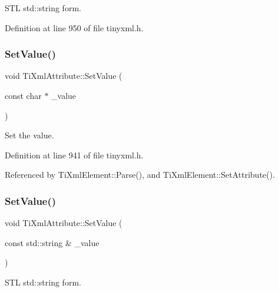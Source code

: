 S\+TL std\+::string form. 



Definition at line 950 of file tinyxml.\+h.

\hypertarget{class_ti_xml_attribute_a2dae44178f668b3cb48101be4f2236a0}{}\label{class_ti_xml_attribute_a2dae44178f668b3cb48101be4f2236a0} 
\subsubsection{\texorpdfstring{Set\+Value()}{SetValue()}\hspace{0.1cm}{\footnotesize\ttfamily [1/2]}}
{\footnotesize\ttfamily void Ti\+Xml\+Attribute\+::\+Set\+Value (\begin{DoxyParamCaption}\item[{const char $\ast$}]{\+\_\+value }\end{DoxyParamCaption})\hspace{0.3cm}{\ttfamily [inline]}}



Set the value. 



Definition at line 941 of file tinyxml.\+h.



Referenced by Ti\+Xml\+Element\+::\+Parse(), and Ti\+Xml\+Element\+::\+Set\+Attribute().

\hypertarget{class_ti_xml_attribute_ab43f67a0cc3ec1d80e62606500f0925f}{}\label{class_ti_xml_attribute_ab43f67a0cc3ec1d80e62606500f0925f} 
\subsubsection{\texorpdfstring{Set\+Value()}{SetValue()}\hspace{0.1cm}{\footnotesize\ttfamily [2/2]}}
{\footnotesize\ttfamily void Ti\+Xml\+Attribute\+::\+Set\+Value (\begin{DoxyParamCaption}\item[{const std\+::string \&}]{\+\_\+value }\end{DoxyParamCaption})\hspace{0.3cm}{\ttfamily [inline]}}



S\+TL std\+::string form. 



